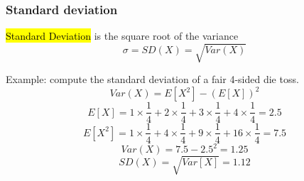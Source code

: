 \documentclass[slidestop,compress,mathserif]{beamer}
\begin{document}
\begin{frame}\frametitle{Standard deviation}

\begin{defn}
\hl{Standard Deviation} is the square root of the variance
\[\sigma = SD(X) = \sqrt{Var(X)}\]
\end{defn}

\pause

Example: compute the standard deviation of a fair 4-sided die toss.
\pause
\[Var(X) = E[X^2] - (E[X])^2\]
\vspace{-0.3cm}
\pause \[ E[X] = 1 \times \frac{1}{4} + 2 \times \frac{1}{4} + 3 \times \frac{1}{4} + 4 \times \frac{1}{4}  = 2.5\]
\pause \[ E[X^2] = 1 \times \frac{1}{4} + 4 \times \frac{1}{4} + 9 \times \frac{1}{4} + 16 \times \frac{1}{4}  = 7.5\]
\pause \[ Var(X) = 7.5 - 2.5^2 = 1.25 \]
\vspace{-0.3cm}
\pause \[ SD(X) = \sqrt{Var[X]} = 1.12\]

\end{frame}
\end{document}
